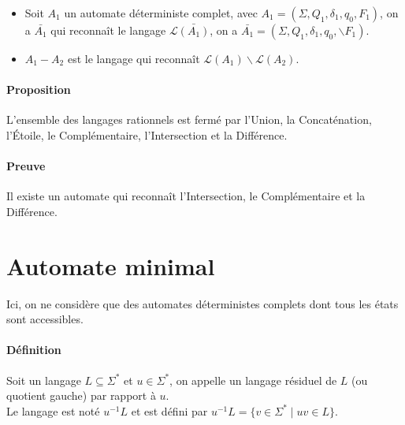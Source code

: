 \begin{itemize}
	\item Soit $A_1$ un automate déterministe complet, avec $A_1=(\Sigma,Q_1,\delta_1,q_0,F_1)$, on a $\bar{A_1}$ qui reconnaît le langage $\mathcal{L}\bar{(A_1)}$, on a $\bar{A_1}=(\Sigma,Q_1,\delta_1,q_0,\backslash{F_1})$.
	\item $A_1 - A_2$ est le langage qui reconnaît $\mathcal{L}(A_1)\backslash{\mathcal{L}(A_2)}$.
\end{itemize}



\paragraph{Proposition} %
\label{par:proposition}

L'ensemble des langages rationnels est fermé par l'Union, la Concaténation, l'Étoile, le Complémentaire, l'Intersection et la Différence.



\paragraph{Preuve} %
\label{par:preuve}

Il existe un automate qui reconnaît l'Intersection, le Complémentaire et la Différence.





\section{Automate minimal} %
\label{sec:automate_minimal}

Ici, on ne considère que des automates déterministes complets dont tous les états sont accessibles.


\paragraph{Définition} %
\label{par:d_finition}

Soit un langage $L \subseteq \Sigma^*$ et $u \in \Sigma^*$, on appelle un langage résiduel de $L$ (ou quotient gauche) par rapport à $u$.\\Le langage est noté $u^{-1}L$ et est défini par $u^{-1}L = \{v \in \Sigma^* \mid uv \in L\}$.

